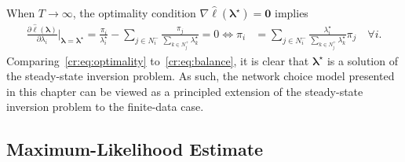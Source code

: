 When $T \to \infty$, the optimality condition $\nabla \hat{\ell} (\bm{\lambda}^\star) = \bm{0}$ implies
\begin{align}
\frac{\partial \hat{\ell}(\bm{\lambda})}{\partial \lambda_i} \bigg|_{\bm{\lambda} = \bm{\lambda}^\star}
    = \frac{\pi_i}{\lambda^\star_i} - \sum_{j \in N^-_i} \frac{\pi_j}{\sum_{k \in N^+_j} \lambda^\star_k} = 0
    \iff \pi_i &= \sum_{j \in N^-_i} \frac{\lambda^\star_i}{\sum_{k \in N^+_j} \lambda^\star_k} \pi_j \quad \forall i. \label{cr:eq:optimality}
\end{align}
Comparing~\eqref{cr:eq:optimality} to~\eqref{cr:eq:balance}, it is clear that $\bm{\lambda}^\star$ is a solution of the steady-state inversion problem.
As such, the network choice model presented in this chapter can be viewed as a principled extension of the steady-state inversion problem to the finite-data case.


\subsection{Maximum-Likelihood Estimate}
\label{cr:sec:maxlik}

